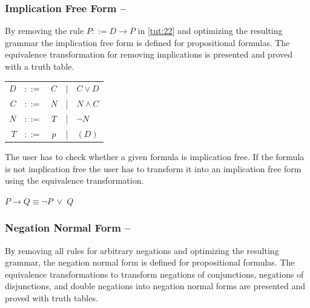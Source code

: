 \subsubsection{Implication Free Form – }
\label{tut:41}
By removing the rule $P ::= D \rightarrow P$ in \vref{tut:22} 
and optimizing the resulting grammar
the implication free form is defined for propositional formulas.
The equivalence transformation
for removing implications is presented
and proved with a truth table. 

\begin{center}
\begin{tabular}{rcccl}
$D$		&$::=$ & $C$ &|& $C \vee D$			\\
$C$		&$::=$ & $N$ &|& $N \wedge C$ 		\\
$N$		&$::=$ & $T$ &|& $\neg N$ 			\\
$T$		&$::=$ & $p$ &|& $(D)$
\end{tabular}
\end{center}

The user has to check whether a given formula is implication free.
If the formula is not implication free the user has to transform it into an implication free form
using the equivalence transformation.

\begin{table}[htdp]
\begin{center}
$P \rightarrow Q \equiv \neg P \;\vee\; Q$
\end{center}
\end{table}

\subsubsection{Negation Normal Form – }
\label{tut:42}
By removing all rules for arbitrary negations 
and optimizing the resulting grammar, 
the negation normal form is defined  for propositional formulas. 
The equivalence transformations to transform negations of conjunctions,
negations of disjunctions, 
and double negations
into negation normal forms are presented 
and proved with truth tables.

